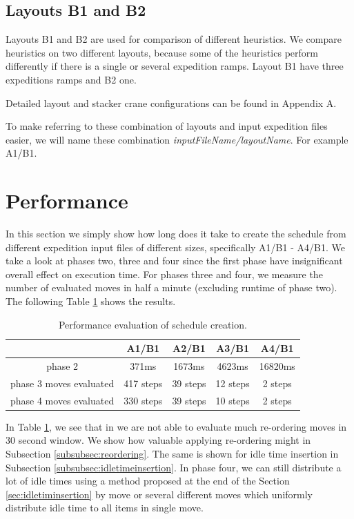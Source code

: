 \documentclass{ctuthesis}
\begin{document}
\subsection{Layouts B1 and B2}
\label{subsec:B}

Layouts B1 and B2 are used for comparison of different heuristics. We compare heuristics on two different layouts, because some of the heuristics perform differently if there is a single or several expedition ramps. Layout B1 have three expeditions ramps and B2 one. 

Detailed layout and stacker crane configurations can be found in Appendix A.

To make referring to these combination of layouts and input expedition files easier, we will name these combination \emph{inputFileName/layoutName}. For example A1/B1.

\section{Performance}

In this section we simply show how long does it take to create the schedule from different expedition input files of different sizes, specifically A1/B1 - A4/B1. We take a look at phases two, three and four since the first phase have insignificant overall effect on execution time. For phases three and four, we measure the number of evaluated moves in half a minute (excluding runtime of phase two). The following Table \ref{tab:perform} shows the results.

\begin{table}[H]
\begin{tabular}{ |c| c c c c|} 
\hline
 & A1/B1 & A2/B1 & A3/B1 & A4/B1\\ 
\hline
phase 2 & 371ms & 1673ms & 4623ms & 16820ms \\
\hline
phase 3 moves evaluated & 417 steps & 39 steps & 12 steps & 2 steps \\ 
\hline
phase 4 moves evaluated & 330 steps & 39 steps & 10 steps & 2 steps \\ 
\hline
\end{tabular}
\caption{Performance evaluation of schedule creation.} \label{tab:perform}
\end{table}

In Table \ref{tab:perform}, we see that in we are not able to evaluate much re-ordering moves in 30 second window. We show how valuable applying re-ordering might in Subsection \ref{subsubsec:reordering}. The same is shown for idle time insertion in Subsection \ref{subsubsec:idletimeinsertion}. In phase four, we can still distribute a lot of idle times using a method proposed at the end of the Section \ref{sec:idletiminsertion} by move or several different moves which uniformly distribute idle time to all items in single move. 
\end{document}

